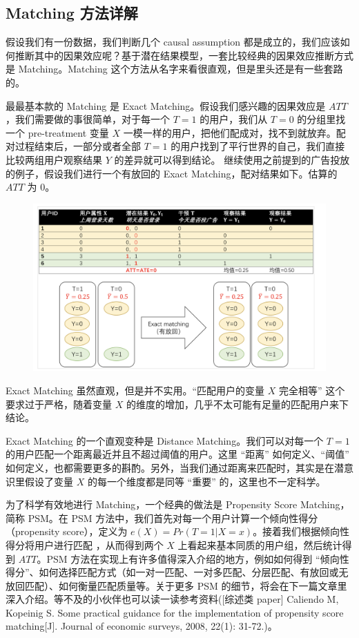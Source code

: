 \documentclass[12pt]{article}
\begin{document}
\subsection{Matching 方法详解}
假设我们有一份数据，我们判断几个 causal assumption 都是成立的，我们应该如何推断其中的因果效应呢？基于潜在结果模型，一套比较经典的因果效应推断方式是 Matching。Matching 这个方法从名字来看很直观，但是里头还是有一些套路的。

最最基本款的 Matching 是 Exact Matching。假设我们感兴趣的因果效应是 $ATT$，我们需要做的事很简单，对于每一个 $T=1$ 的用户，我们从 $T=0$ 的分组里找一个 pre-treatment 变量 $X$ 一模一样的用户，把他们配成对，找不到就放弃。配对过程结束后，一部分或者全部 $T=1$ 的用户找到了平行世界的自己，我们直接比较两组用户观察结果 $Y$ 的差异就可以得到结论。 继续使用之前提到的广告投放的例子，假设我们进行一个有放回的 Exact Matching，配对结果如下。估算的 $ATT$ 为 0。
\begin{figure}[H]
    \centering
    \includegraphics[width=1\textwidth]{fig/CasualInference-Game-Ad-2.png}
\end{figure}

Exact Matching 虽然直观，但是并不实用。“匹配用户的变量  $X$ 完全相等” 这个要求过于严格，随着变量 $X$ 的维度的增加，几乎不太可能有足量的匹配用户来下结论。

Exact Matching 的一个直观变种是 Distance Matching。我们可以对每一个 $T=1$ 的用户匹配一个距离最近并且不超过阈值的用户。这里 “距离” 如何定义、“阈值” 如何定义，也都需要更多的斟酌。另外，当我们通过距离来匹配时，其实是在潜意识里假设了变量 $X$ 的每一个维度都是同等 “重要” 的，这里也不一定科学。

为了科学有效地进行 Matching，一个经典的做法是 Propensity Score Matching，简称 PSM。在 PSM 方法中，我们首先对每一个用户计算一个倾向性得分（propensity score），定义为 $e(X)=Pr(T=1|X=x)$。接着我们根据倾向性得分将用户进行匹配 ，从而得到两个 $X$ 上看起来基本同质的用户组，然后统计得到 $ATT$。PSM 方法在实现上有许多值得深入介绍的地方，例如如何得到 “倾向性得分”、如何选择匹配方式（如一对一匹配、一对多匹配、分层匹配、有放回或无放回匹配）、如何衡量匹配质量等。关于更多 PSM 的细节，将会在下一篇文章里深入介绍。等不及的小伙伴也可以读一读参考资料([综述类 paper] Caliendo M, Kopeinig S. Some practical guidance for the implementation of propensity score matching[J]. Journal of economic surveys, 2008, 22(1): 31-72.)。
\end{document}
